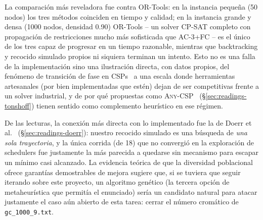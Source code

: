 \documentclass[11pt,onecolumn,letterpaper]{article}
\newcommand{\code}[1]{\texttt{#1}}
\begin{document}
La comparaci\'on m\'as reveladora fue contra OR-Tools: en la instancia peque\~na (50
nodos) los tres m\'etodos coinciden en tiempo y calidad; en la instancia grande y densa
(1000 nodos, densidad 0.90) OR-Tools -- un solver CP-SAT completo con propagaci\'on de
restricciones mucho m\'as sofisticada que AC-3+FC -- es el \'unico de los tres capaz de
progresar en un tiempo razonable, mientras que backtracking y recocido simulado propios ni
siquiera terminan un intento. Esto no es una falla de la implementaci\'on sino una
ilustraci\'on directa, con datos propios, del fen\'omeno de transici\'on de fase en
CSPs~\cite{cheeseman1991hard} a una escala donde herramientas artesanales (por bien
implementadas que est\'en) dejan de ser competitivas frente a un solver industrial, y de
por qu\'e propuestas como \textsc{Any-CSP}~\cite{tonshoff2023onemodel}
(\S\ref{sec:readings-tonshoff}) tienen sentido como complemento heur\'istico en ese
r\'egimen.

De las lecturas, la conexi\'on m\'as directa con lo implementado fue la de Doerr et
al.~\cite{doerr2024runtime} (\S\ref{sec:readings-doerr}): nuestro recocido simulado es una
b\'usqueda de \emph{una sola trayectoria}, y la \'unica corrida (de 18) que no convergi\'o en
la exploraci\'on de schedulers fue justamente la m\'as parecida a quedarse sin mecanismo
para escapar un m\'inimo casi alcanzado. La evidencia te\'orica de que la diversidad
poblacional ofrece garant\'ias demostrables de mejora sugiere que, si se tuviera que
seguir iterando sobre este proyecto, un algoritmo gen\'etico (la tercera opci\'on de
metaheur\'istica que permit\'ia el enunciado) ser\'ia un candidato natural para atacar
justamente el caso a\'un abierto de esta tarea: cerrar el n\'umero crom\'atico de
\code{gc\_1000\_9.txt}.
\end{document}
